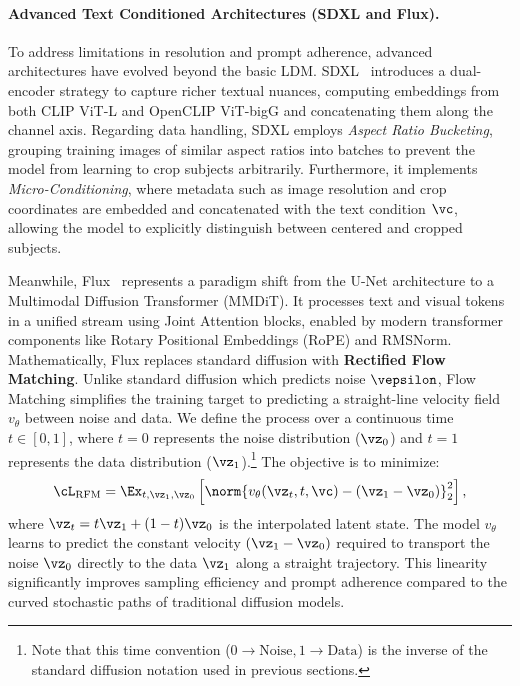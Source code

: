 \documentclass[../../book-main.tex]{subfiles}
\begin{document}
\paragraph{Advanced Text Conditioned Architectures (SDXL and Flux).}
To address limitations in resolution and prompt adherence, advanced architectures have evolved beyond the basic LDM.
SDXL~\citep{podell2023sdxl} introduces a dual-encoder strategy to capture richer textual nuances, computing embeddings from both CLIP ViT-L and OpenCLIP ViT-bigG and concatenating them along the channel axis.
Regarding data handling, SDXL employs \textit{Aspect Ratio Bucketing}, grouping training images of similar aspect ratios into batches to prevent the model from learning to crop subjects arbitrarily.
Furthermore, it implements \textit{Micro-Conditioning}, where metadata such as image resolution and crop coordinates are embedded and concatenated with the text condition \(\vc\), allowing the model to explicitly distinguish between centered and cropped subjects.

Meanwhile, Flux~\citep{flux2024} represents a paradigm shift from the U-Net architecture to a Multimodal Diffusion Transformer (MMDiT).
It processes text and visual tokens in a unified stream using Joint Attention blocks, enabled by modern transformer components like Rotary Positional Embeddings (RoPE) and RMSNorm.
Mathematically, Flux replaces standard diffusion with \textbf{Rectified Flow Matching}. Unlike standard diffusion which predicts noise \(\vepsilon\), Flow Matching simplifies the training target to predicting a straight-line velocity field \(v_{\theta}\) between noise and data.
We define the process over a continuous time \(t \in [0, 1]\), where \(t = 0\) represents the noise distribution (\(\vz_{0}\)) and \(t = 1\) represents the data distribution (\(\vz_{1}\)).\footnote{Note that this time convention (\(0 \to \text{Noise}, 1 \to \text{Data}\)) is the inverse of the standard diffusion notation used in previous sections.} The objective is to minimize:
\begin{equation}
    \cL_{\text{RFM}} = \Ex_{t, \vz_{1}, \vz_{0}} \left[ \norm{v_{\theta}(\vz_{t}, t, \vc) - (\vz_{1} - \vz_{0})}_{2}^{2} \right] ,
\end{equation}
where \(\vz_{t} = t \vz_{1} + (1-t) \vz_{0}\) is the interpolated latent state.
The model \(v_{\theta}\) learns to predict the constant velocity \((\vz_{1} - \vz_{0})\) required to transport the noise \(\vz_{0}\) directly to the data \(\vz_{1}\) along a straight trajectory.
This linearity significantly improves sampling efficiency and prompt adherence compared to the curved stochastic paths of traditional diffusion models.
\end{document}
